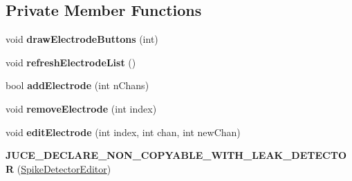 \subsection*{Private Member Functions}
\begin{DoxyCompactItemize}
\item 
\hypertarget{classSpikeDetectorEditor_a8a12482ef358229d2475c60119ecfd2e}{void {\bfseries draw\-Electrode\-Buttons} (int)}\label{classSpikeDetectorEditor_a8a12482ef358229d2475c60119ecfd2e}

\item 
\hypertarget{classSpikeDetectorEditor_a86363456281c79b98c12da2f1c5f36f6}{void {\bfseries refresh\-Electrode\-List} ()}\label{classSpikeDetectorEditor_a86363456281c79b98c12da2f1c5f36f6}

\item 
\hypertarget{classSpikeDetectorEditor_a3478bc7c45b115a1e9a913ba525668ff}{bool {\bfseries add\-Electrode} (int n\-Chans)}\label{classSpikeDetectorEditor_a3478bc7c45b115a1e9a913ba525668ff}

\item 
\hypertarget{classSpikeDetectorEditor_a9c44e850937729a2e7964ddf3d5d83fc}{void {\bfseries remove\-Electrode} (int index)}\label{classSpikeDetectorEditor_a9c44e850937729a2e7964ddf3d5d83fc}

\item 
\hypertarget{classSpikeDetectorEditor_a689d1c5f9f678f25e125c97bf45af10e}{void {\bfseries edit\-Electrode} (int index, int chan, int new\-Chan)}\label{classSpikeDetectorEditor_a689d1c5f9f678f25e125c97bf45af10e}

\item 
\hypertarget{classSpikeDetectorEditor_ae4e0d69017db6a0c3d35c44b92306e53}{{\bfseries J\-U\-C\-E\-\_\-\-D\-E\-C\-L\-A\-R\-E\-\_\-\-N\-O\-N\-\_\-\-C\-O\-P\-Y\-A\-B\-L\-E\-\_\-\-W\-I\-T\-H\-\_\-\-L\-E\-A\-K\-\_\-\-D\-E\-T\-E\-C\-T\-O\-R} (\hyperlink{classSpikeDetectorEditor}{Spike\-Detector\-Editor})}\label{classSpikeDetectorEditor_ae4e0d69017db6a0c3d35c44b92306e53}

\end{DoxyCompactItemize}
